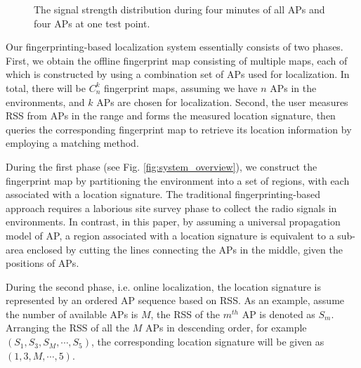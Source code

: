 \documentclass[10pt, conference, letterpaper]{IEEEtran}
\begin{document}
\begin{figure}
  \centering
   \caption[RSS of the APS]
{The signal strength distribution during four minutes of all APs and four APs at one test point.}
\label{fig:RSS}
\vspace{-0.2in}
\end{figure}

Our fingerprinting-based localization system essentially consists of two phases. 
First, 
we obtain the offline fingerprint map consisting of multiple maps, 
each of which is constructed by using a combination set of APs used for localization. 
In total, there will be $C_n^k$ fingerprint maps, 
assuming we have $n$ APs in the environments, and $k$ APs are chosen for localization. 
Second, the user measures RSS from APs in the range and forms the measured location signature, 
then queries the corresponding fingerprint map to retrieve its location information by employing a matching method. 

During the first phase (see Fig. \ref{fig:system_overview}), 
we construct the fingerprint map by partitioning the environment into a set of regions, with each associated with a location signature. 
The traditional fingerprinting-based approach requires a laborious site survey phase to collect the radio signals in environments. 
In contrast, in this paper, by assuming a universal propagation model of AP, 
a region associated with a location signature is equivalent to a sub-area enclosed by cutting the lines connecting the APs in the middle, given the positions of APs.

During the second phase, i.e. online localization, the location signature is represented by an ordered AP sequence based on RSS. 
As an example, assume the number of available APs is $M$, the RSS of the $m^{th}$ AP is denoted as $S_m$. 
Arranging the RSS of all the $M$ APs in descending order, for example $(S_1, S_3, S_M, \cdots, S_5)$, the corresponding location signature will be given as $(1, 3, M, \cdots, 5)$.
\end{document}
